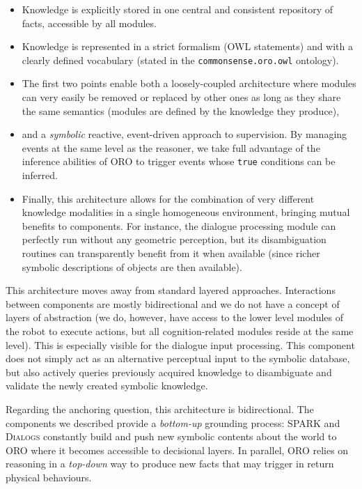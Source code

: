 \documentclass{svmult}
\begin{document}
\begin{itemize}
\item{Knowledge is explicitly stored in one central and consistent repository
of facts, accessible by all modules.}
\item{Knowledge is represented in a strict formalism (OWL statements) and
with a clearly defined vocabulary (stated in the {\tt commonsense.oro.owl}
ontology).}
\item{The first two points enable both a loosely-coupled
architecture where modules can very easily be removed or replaced by other ones
as long as they share the same semantics (modules are defined by the knowledge
they produce),}
\item{and a \emph{symbolic} reactive, event-driven approach
to supervision. By managing events at the same level as
the reasoner, we take full advantage of the inference abilities of ORO to
trigger events whose \texttt{true} conditions can be inferred.}
\item{Finally, this architecture allows for the combination of very different knowledge
modalities in a single homogeneous environment, bringing mutual benefits to
components. For instance, the dialogue processing module can perfectly run
without any geometric perception, but its disambiguation routines can
transparently benefit from it when available (since richer symbolic
descriptions of objects are then available).}
\end{itemize}

This architecture moves away from standard layered approaches. Interactions
between components are mostly bidirectional and we do not have a concept of
layers of abstraction (we do, however, have access to the lower level modules
of the robot to execute actions, but all cognition-related modules reside at the
same level). This is especially visible for the dialogue input processing. This
component does not simply act as an alternative perceptual input to the
symbolic database, but also actively queries previously acquired knowledge to
disambiguate and validate the newly created symbolic knowledge.


Regarding the anchoring question, this architecture is
bidirectional. The components we described provide a \textit{bottom-up}
grounding process: SPARK and \textsc{Dialogs} constantly build and push new
symbolic contents about the world to ORO where it becomes accessible to
decisional layers. In parallel, ORO relies on reasoning in a \textit{top-down}
way to produce new facts that may trigger in return physical behaviours. 
\end{document}
